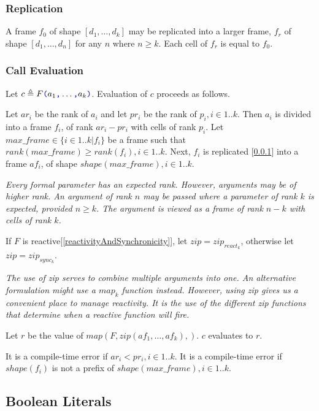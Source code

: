 \documentclass{article}
\begin{document}
\subsubsection{Replication}
\label{replication}

A frame $f_0$ of shape $[d_1, \ldots, d_k]$ may be replicated into a larger frame, $f_r$ of shape $[d_1, \ldots, d_n]$ for any $n$ where $n \ge k$. Each cell of $f_r$ is equal to $f_0$.




\subsubsection{Call Evaluation}
\label{callEvaluation}


Let $c \triangleq F\texttt{\color{blue} (}{}a_1\texttt{\color{blue} ,}{} \ldots\texttt{\color{blue} ,}{} a_k\texttt{\color{blue} )}$. Evaluation of $c$ proceeds as follows. 

Let $ar_i$ be the rank of $a_i$ and let $pr_i$ be the rank of $p_i, i \in 1.. k$. Then  $a_i$ is divided into a frame $f_i$, of rank $ar_i - pr_i$ with cells of rank $p_i$. Let $max\_frame \in \{i \in 1..k | f_i\}$ be a frame such that $rank(max\_frame) \ge rank(f_i), i \in 1 ..k$. Next, $f_i$ is replicated [\ref{replication}] into a frame $af_i$, of shape $shape(max\_frame), i \in 1..k$. 

{\em
Every formal parameter has an expected rank. However, arguments may be of higher rank. An argument of rank $n$ may be passed where a parameter of rank $k$ is expected, provided $n \ge k$. The argument is viewed as a frame of rank $n-k$ with cells of rank $k$. 
}

If $F$ is reactive[\ref{reactivityAndSynchronicity}], let $zip = zip_{react_k}$, otherwise let $zip = zip_{sync_k}$.

{\em
The use of zip serves to combine multiple arguments into one. An alternative formulation might use a $map_k$ function instead.
However, using zip gives us a convenient place to manage reactivity.
It is the use of the different zip functions that determine when a reactive function will fire. 
}

Let $r$ be the value of $map(F, zip(af_1, \ldots, af_k),)$. $c$ evaluates to $r$.



It is a compile-time error if $ar_i < pr_i, i \in 1..k$. It is a compile-time error if $shape(f_i)$ is not a prefix of $shape(max\_frame), i \in 1..k$. 


\subsection{Boolean Literals}
\label{booleanLiterals}
\end{document}
